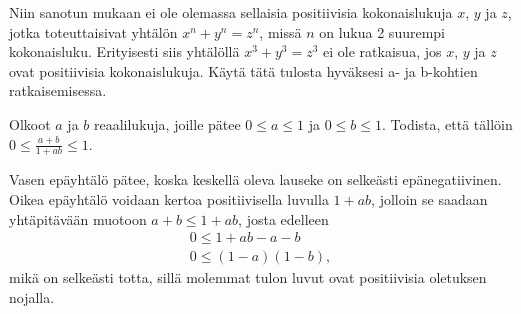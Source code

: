 \begin{kotitehtavasivu}
	\begin{tehtava}
		Niin sanotun  mukaan ei ole
		olemassa sellaisia positiivisia kokonaislukuja $x$, $y$
		ja $z$, jotka toteuttaisivat yhtälön $x^{n} + y^{n} = z^{n}$,
		missä $n$ on lukua 2 suurempi kokonaisluku.
		Erityisesti siis yhtälöllä $x^{3} + y^{3} = z^{3}$ ei
		ole ratkaisua, jos $x$, $y$ ja $z$ ovat positiivisia
		kokonaislukuja. Käytä tätä tulosta hyväksesi a- ja b-kohtien ratkaisemisessa.
		
		\begin{vastaus}
		\end{vastaus}
	\end{tehtava}

	\begin{tehtava}
		Olkoot $a$ ja $b$ reaalilukuja, joille pätee $0 \le a \le 1$ ja $0 \le b \le 1$.
		Todista, että tällöin $0 \le \frac{a + b}{1 + ab} \le 1$.
		\begin{vastaus}
			Vasen epäyhtälö pätee, koska keskellä oleva lauseke on selkeästi epänegatiivinen. Oikea epäyhtälö voidaan kertoa positiivisella luvulla $1 + ab$, jolloin se saadaan yhtäpitävään muotoon $a  + b \le 1 + ab$, josta edelleen
			\begin{align*}
				0 \le 1+ ab - a - b \\
				0 \le (1-a)(1-b),
			\end{align*}
			mikä on selkeästi totta, sillä molemmat tulon luvut ovat positiivisia oletuksen nojalla.
		\end{vastaus}
	\end{tehtava}

\end{kotitehtavasivu}
